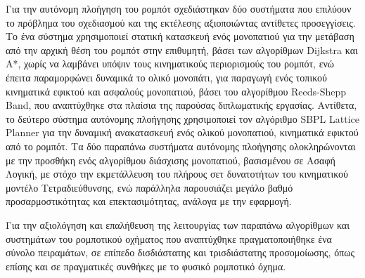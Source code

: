 \documentclass[
11pt, %
twoside, %
english,
headsepline, %
]{MastersDoctoralThesis} %
\begin{document}
\begin{summary}
\bigskip
Για την αυτόνομη πλοήγηση του ρομπότ σχεδιάστηκαν δύο συστήματα που επιλύουν το πρόβλημα του σχεδιασμού και της εκτέλεσης αξιοποιώντας αντίθετες προσεγγίσεις. Το ένα σύστημα χρησιμοποιεί στατική κατασκευή ενός μονοπατιού για την μετάβαση από την αρχική θέση του ρομπότ στην επιθυμητή, βάσει των αλγορίθμων Dijkstra και Α*, χωρίς να λαμβάνει υπόψιν τους κινηματικούς περιορισμούς του ρομπότ, ενώ έπειτα παραμορφώνει δυναμικά το ολικό μονοπάτι, για παραγωγή ενός τοπικού κινηματικά εφικτού και ασφαλούς μονοπατιού, βάσει του αλγορίθμου Reeds-Shepp Band, που αναπτύχθηκε στα πλαίσια της παρούσας διπλωματικής εργασίας. Αντίθετα, το δεύτερο σύστημα αυτόνομης πλοήγησης χρησιμοποιεί τον αλγόριθμο SBPL Lattice Planner για την δυναμική ανακατασκευή ενός ολικού μονοπατιού, κινηματικά εφικτού από το ρομπότ. Τα δύο παραπάνω συστήματα αυτόνομης πλοήγησης ολοκληρώνονται με την προσθήκη ενός αλγορίθμου διάσχισης μονοπατιού, βασισμένου σε Ασαφή Λογική, με στόχο την εκμετάλλευση του πλήρους σετ δυνατοτήτων του κινηματικού μοντέλο Τετραδιεύθυνσης, ενώ παράλληλα παρουσιάζει μεγάλο βαθμό προσαρμοστικότητας και επεκτασιμότητας, ανάλογα με την εφαρμογή.

\bigskip
Για την αξιολόγηση και επαλήθευση  της λειτουργίας των παραπάνω αλγορίθμων και συστημάτων του ρομποτικού οχήματος που αναπτύχθηκε πραγματοποιήθηκε ένα σύνολο πειραμάτων, σε επίπεδο δισδιάστατης και τρισδιάστατης προσομοίωσης, όπως επίσης και σε πραγματικές συνθήκες με το φυσικό ρομποτικό όχημα.
\end{summary}


\end{document}
